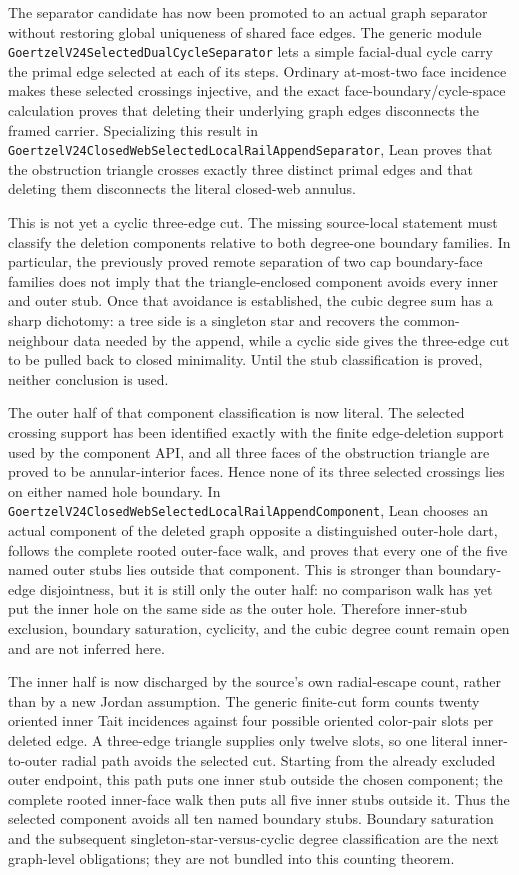 \documentclass[11pt]{article}
\theoremstyle{definition}
\begin{document}
The separator candidate has now been promoted to an actual graph separator
without restoring global uniqueness of shared face edges.  The generic module
\texttt{GoertzelV24SelectedDualCycleSeparator} lets a simple facial-dual cycle
carry the primal edge selected at each of its steps.  Ordinary at-most-two
face incidence makes these selected crossings injective, and the exact
face-boundary/cycle-space calculation proves that deleting their underlying
graph edges disconnects the framed carrier.  Specializing this result in
\texttt{GoertzelV24ClosedWebSelectedLocalRailAppendSeparator}, Lean proves that
the obstruction triangle crosses exactly three distinct primal edges and
that deleting them disconnects the literal closed-web annulus.

This is not yet a cyclic three-edge cut.  The missing source-local statement
must classify the deletion components relative to both degree-one boundary
families.  In particular, the previously proved remote separation of two cap
boundary-face families does not imply that the triangle-enclosed component
avoids every inner and outer stub.  Once that avoidance is established, the
cubic degree sum has a sharp dichotomy: a tree side is a singleton star and
recovers the common-neighbour data needed by the append, while a cyclic side
gives the three-edge cut to be pulled back to closed minimality.  Until the
stub classification is proved, neither conclusion is used.

The outer half of that component classification is now literal.  The selected
crossing support has been identified exactly with the finite edge-deletion
support used by the component API, and all three faces of the obstruction
triangle are proved to be annular-interior faces.  Hence none of its three
selected crossings lies on either named hole boundary.  In
\texttt{GoertzelV24ClosedWebSelectedLocalRailAppendComponent}, Lean chooses an
actual component of the deleted graph opposite a distinguished outer-hole
dart, follows the complete rooted outer-face walk, and proves that every one
of the five named outer stubs lies outside that component.  This is stronger
than boundary-edge disjointness, but it is still only the outer half: no
comparison walk has yet put the inner hole on the same side as the outer hole.
Therefore inner-stub exclusion, boundary saturation, cyclicity, and the cubic
degree count remain open and are not inferred here.

The inner half is now discharged by the source's own radial-escape count,
rather than by a new Jordan assumption.  The generic finite-cut form counts
twenty oriented inner Tait incidences against four possible oriented
color-pair slots per deleted edge.  A three-edge triangle supplies only twelve
slots, so one literal inner-to-outer radial path avoids the selected cut.
Starting from the already excluded outer endpoint, this path puts one inner
stub outside the chosen component; the complete rooted inner-face walk then
puts all five inner stubs outside it.  Thus the selected component avoids all
ten named boundary stubs.  Boundary saturation and the subsequent
singleton-star-versus-cyclic degree classification are the next graph-level
obligations; they are not bundled into this counting theorem.
\end{document}
